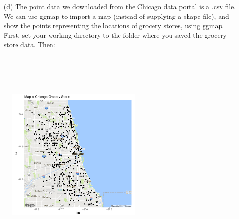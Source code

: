\documentclass{beamer}
\begin{document}
\begin{frame}[allowframebreaks]
	
	\begin{myexccont}
	\fontsize{9pt}{11}\selectfont
		\begin{enumerate}[(a)]
			\item[(d)]
			The point data we downloaded from the Chicago data portal is a .csv file. We can use ggmap to import a map (instead of supplying a shape file), and show the points representing the locations of grocery stores, using ggmap. First, set your working directory to the folder where you saved the grocery store data. Then:\\
			\\
			\\
            \\
            \\
		\end{enumerate}
	\end{myexccont}


	\begin{figure}
	\centering
	\includegraphics[width=0.6\textwidth]{figures/grocerystores}
	\label{Fig: map}
	\end{figure}
	

\end{frame}
\end{document}
